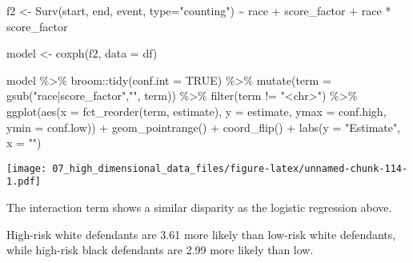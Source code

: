 \documentclass[
]{book}
\newenvironment{Shaded}{\begin{snugshade}}{\end{snugshade}}
\newcommand{\AttributeTok}[1]{\textcolor[rgb]{0.77,0.63,0.00}{#1}}
\newcommand{\ConstantTok}[1]{\textcolor[rgb]{0.00,0.00,0.00}{#1}}
\newcommand{\FunctionTok}[1]{\textcolor[rgb]{0.00,0.00,0.00}{#1}}
\newcommand{\NormalTok}[1]{#1}
\newcommand{\OtherTok}[1]{\textcolor[rgb]{0.56,0.35,0.01}{#1}}
\newcommand{\SpecialCharTok}[1]{\textcolor[rgb]{0.00,0.00,0.00}{#1}}
\newcommand{\StringTok}[1]{\textcolor[rgb]{0.31,0.60,0.02}{#1}}
\begin{document}
\begin{Shaded}
\begin{Highlighting}[]
\NormalTok{f2 }\OtherTok{\textless{}{-}} \FunctionTok{Surv}\NormalTok{(start, end, event, }\AttributeTok{type=}\StringTok{"counting"}\NormalTok{) }\SpecialCharTok{\textasciitilde{}}\NormalTok{ race }\SpecialCharTok{+}\NormalTok{ score\_factor }\SpecialCharTok{+}\NormalTok{ race }\SpecialCharTok{*}\NormalTok{ score\_factor}

\NormalTok{model }\OtherTok{\textless{}{-}} \FunctionTok{coxph}\NormalTok{(f2, }\AttributeTok{data =}\NormalTok{ df)}

\NormalTok{model }\SpecialCharTok{\%\textgreater{}\%}
\NormalTok{  broom}\SpecialCharTok{::}\FunctionTok{tidy}\NormalTok{(}\AttributeTok{conf.int =} \ConstantTok{TRUE}\NormalTok{) }\SpecialCharTok{\%\textgreater{}\%}
  \FunctionTok{mutate}\NormalTok{(}\AttributeTok{term =} \FunctionTok{gsub}\NormalTok{(}\StringTok{"race|score\_factor"}\NormalTok{,}\StringTok{""}\NormalTok{, term)) }\SpecialCharTok{\%\textgreater{}\%} 
  \FunctionTok{filter}\NormalTok{(term }\SpecialCharTok{!=} \StringTok{"\textless{}chr\textgreater{}"}\NormalTok{) }\SpecialCharTok{\%\textgreater{}\%}
  \FunctionTok{ggplot}\NormalTok{(}\FunctionTok{aes}\NormalTok{(}\AttributeTok{x =} \FunctionTok{fct\_reorder}\NormalTok{(term, estimate), }\AttributeTok{y =}\NormalTok{ estimate, }\AttributeTok{ymax =}\NormalTok{ conf.high, }\AttributeTok{ymin =}\NormalTok{ conf.low)) }\SpecialCharTok{+}
  \FunctionTok{geom\_pointrange}\NormalTok{() }\SpecialCharTok{+}
  \FunctionTok{coord\_flip}\NormalTok{() }\SpecialCharTok{+}
  \FunctionTok{labs}\NormalTok{(}\AttributeTok{y =} \StringTok{"Estimate"}\NormalTok{, }\AttributeTok{x =} \StringTok{""}\NormalTok{)}
\end{Highlighting}
\end{Shaded}

\texttt{[image: 07\_high\_dimensional\_data\_files/figure-latex/unnamed-chunk-114-1.pdf]}

The interaction term shows a similar disparity as the logistic regression above.

High-risk white defendants are 3.61 more likely than low-risk white defendants, while high-risk black defendants are 2.99 more likely than low.
\end{document}
